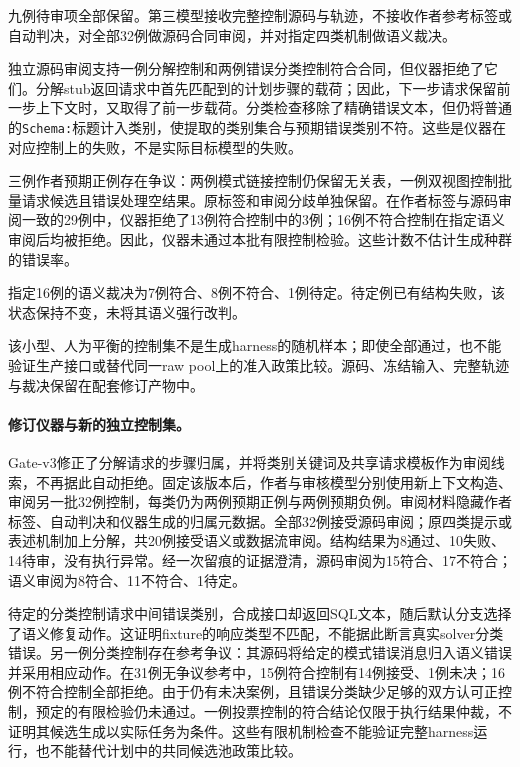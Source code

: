 九例待审项全部保留。第三模型接收完整控制源码与轨迹，不接收作者参考标签或自动判决，对全部32例做源码合同审阅，并对指定四类机制做语义裁决。

独立源码审阅支持一例分解控制和两例错误分类控制符合合同，但仪器拒绝了它们。分解stub返回请求中首先匹配到的计划步骤的载荷；因此，下一步请求保留前一步上下文时，又取得了前一步载荷。分类检查移除了精确错误文本，但仍将普通的\texttt{Schema:}标题计入类别，使提取的类别集合与预期错误类别不符。这些是仪器在对应控制上的失败，不是实际目标模型的失败。

三例作者预期正例存在争议：两例模式链接控制仍保留无关表，一例双视图控制批量请求候选且错误处理空结果。原标签和审阅分歧单独保留。在作者标签与源码审阅一致的29例中，仪器拒绝了13例符合控制中的3例；16例不符合控制在指定语义审阅后均被拒绝。因此，仪器未通过本批有限控制检验。这些计数不估计生成种群的错误率。

指定16例的语义裁决为7例符合、8例不符合、1例待定。待定例已有结构失败，该状态保持不变，未将其语义强行改判。

该小型、人为平衡的控制集不是生成harness的随机样本；即使全部通过，也不能验证生产接口或替代同一raw pool上的准入政策比较。源码、冻结输入、完整轨迹与裁决保留在配套修订产物中。

\paragraph{修订仪器与新的独立控制集。}
Gate-v3修正了分解请求的步骤归属，并将类别关键词及共享请求模板作为审阅线索，不再据此自动拒绝。固定该版本后，作者与审核模型分别使用新上下文构造、审阅另一批32例控制，每类仍为两例预期正例与两例预期负例。审阅材料隐藏作者标签、自动判决和仪器生成的归属元数据。全部32例接受源码审阅；原四类提示或表述机制加上分解，共20例接受语义或数据流审阅。结构结果为8通过、10失败、14待审，没有执行异常。经一次留痕的证据澄清，源码审阅为15符合、17不符合；语义审阅为8符合、11不符合、1待定。

待定的分类控制请求中间错误类别，合成接口却返回SQL文本，随后默认分支选择了语义修复动作。这证明fixture的响应类型不匹配，不能据此断言真实solver分类错误。另一例分类控制存在参考争议：其源码将给定的模式错误消息归入语义错误并采用相应动作。在31例无争议参考中，15例符合控制有14例接受、1例未决；16例不符合控制全部拒绝。由于仍有未决案例，且错误分类缺少足够的双方认可正控制，预定的有限检验仍未通过。一例投票控制的符合结论仅限于执行结果仲裁，不证明其候选生成以实际任务为条件。这些有限机制检查不能验证完整harness运行，也不能替代计划中的共同候选池政策比较。

